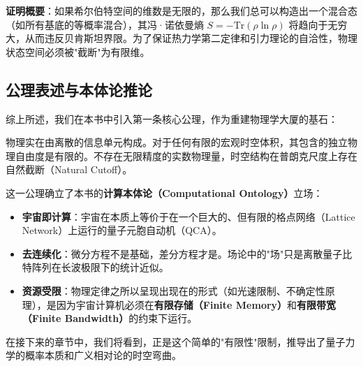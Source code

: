 \textbf{证明概要}：如果希尔伯特空间的维数是无限的，那么我们总可以构造出一个混合态（如所有基底的等概率混合），其冯·诺依曼熵 $S = -\text{Tr}(\rho \ln \rho)$ 将趋向于无穷大，从而违反贝肯斯坦界限。为了保证热力学第二定律和引力理论的自洽性，物理状态空间必须被"截断"为有限维。

\subsection{公理表述与本体论推论}

综上所述，我们在本书中引入第一条核心公理，作为重建物理学大厦的基石：

\begin{axiom}[有限信息公理]
物理实在由离散的信息单元构成。对于任何有限的宏观时空体积，其包含的独立物理自由度是有限的。不存在无限精度的实数物理量，时空结构在普朗克尺度上存在自然截断（Natural Cutoff）。
\end{axiom}

这一公理确立了本书的\textbf{计算本体论（Computational Ontology）}立场：

\begin{itemize}
\item \textbf{宇宙即计算}：宇宙在本质上等价于在一个巨大的、但有限的格点网络（Lattice Network）上运行的量子元胞自动机（QCA）。

\item \textbf{去连续化}：微分方程不是基础，差分方程才是。场论中的"场"只是离散量子比特阵列在长波极限下的统计近似。

\item \textbf{资源受限}：物理定律之所以呈现出现在的形式（如光速限制、不确定性原理），是因为宇宙计算机必须在\textbf{有限存储（Finite Memory）}和\textbf{有限带宽（Finite Bandwidth）}的约束下运行。
\end{itemize}

在接下来的章节中，我们将看到，正是这个简单的"有限性"限制，推导出了量子力学的概率本质和广义相对论的时空弯曲。
